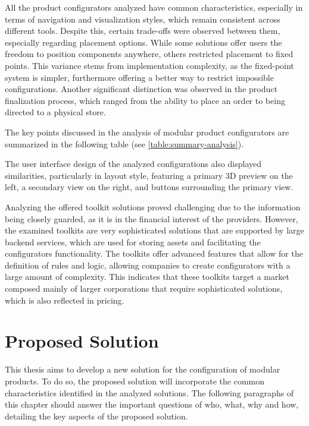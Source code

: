 All the product configurators analyzed have common characteristics, especially in terms of navigation and visualization styles, which remain consistent across different tools. Despite this, certain trade-offs were observed between them, especially regarding placement options. While some solutions offer users the freedom to position components anywhere, others restricted placement to fixed points. This variance stems from implementation complexity, as the fixed-point system is simpler, furthermore offering a better way to restrict impossible configurations.
Another significant distinction was observed in the product finalization process, which ranged from the ability to place an order to being directed to a physical store.

The key points discussed in the analysis of modular product configurators are summarized in the following table (see \autoref{table:summary-analysis}).

The user interface design of the analyzed configurations also displayed similarities, particularly in layout style, featuring a primary 3D preview on the left, a secondary view on the right, and buttons surrounding the primary view.

Analyzing the offered toolkit solutions proved challenging due to the information being closely guarded, as it is in the financial interest of the providers. However, the examined toolkits are very sophisticated solutions that are supported by large backend services, which are used for storing assets and facilitating the configurators functionality. The toolkits offer advanced features that allow for the definition of rules and logic, allowing companies to create configurators with a large amount of complexity. This indicates that these toolkits target a market composed mainly of larger corporations that require sophisticated solutions, which is also reflected in pricing.

\section{Proposed Solution}

This thesis aims to develop a new solution for the configuration of modular products. To do so, the proposed solution will incorporate the common characteristics identified in the analyzed solutions. The following paragraphs of this chapter should answer the important questions of who, what, why and how, detailing the key aspects of the proposed solution. 

